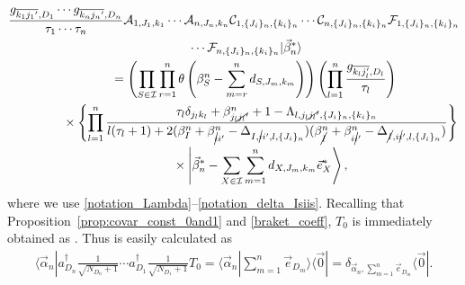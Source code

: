 \documentclass[10pt,a4paper]{amsart}
\numberwithin{equation}{section}
\begin{document}
\begin{gather}
 \frac{
 g_{\overline{k_{1}{j_{1}}'},D_{1}}
 \cdots
 g_{\overline{k_{n}{j_{n}}'},D_{n}}
 }{
 \tau_{1}
 \cdots
 \tau_{n}
 }
 \mathcal{A}_{
 1,
 J_{1},
 k_{1}
 }
 \cdots
 \mathcal{A}_{
 n,
 J_{n},
 k_{n}
 }
 \mathcal{C}_{
 1,
 \{
 J_{i}
 \}_{n}
 ,
 \{
 k_{i}
 \}_{n}
 }
 \cdots
 \mathcal{C}_{
 n,
 \{
 J_{i}
 \}_{n}
 ,
 \{
 k_{i}
 \}_{n}
 }
 \mathcal{F}_{
 1,
 \{
 J_{i}
 \}_{n}
 ,
 \{
 k_{i}
 \}_{n}
 }\nonumber\\
 \qquad
 \cdots
 \mathcal{F}_{
 n,
 \{
 J_{i}
 \}_{n}
 ,
 \{
 k_{i}
 \}_{n}
 }
 |
 \vec{\beta}_{n}^{\ast}
 \rangle
 \nonumber
 \\
 \qquad\phantom{\cdots}{}=
 \left(
 \prod_{
 S
 \in
 \mathcal{I}
 }
 \prod_{r=1}^{n}
 \theta
 \left(
 \beta_{S}^{n}
 -
 \sum_{m=r}^{n}
 d_{
 S,
 J_{m},
 k_{m}
 }
 \right)
 \right)
 \left(
 \prod_{l=1}^{n}
 \frac{g_{\overline{k_{l}j_{l}'},D_{l}}}{\tau_{l}}
 \right)\nonumber
 \\
 \qquad\phantom{\cdots=}{}
 \times
 \left\{
 \prod_{l=1}^{n}
 \frac{
 \tau_{l}
 \delta_{j_{l}k_{l}}
 +
 \beta_{j_{l}\cancel{j_{l}}'}^{n}
 +
 1
 -
 \Lambda_{
 l,
 j_{l}\cancel{j_{l}}',
 \{
 J_{i}
 \}_{n}
 ,
 \{
 k_{i}
 \}_{n}
 }
 }{
 l
 (
 \tau_{l}+1
 )
 +
 2
 (
 \beta_{I}^{n}
 +
 \beta_{\cancel{i}i'}^{n}
 -
 \Delta_{
 I,
 \cancel{i}i',
 l,
 \{
 J_{i}
 \}_{n}
 }
 )
 (
 \beta_{\cancel{I}}^{n}
 +
 \beta_{i\cancel{i}'}^{n}
 -
 \Delta_{
 \cancel{I},
 i\cancel{i}',
 l,
 \{
 J_{i}
 \}_{n}
 }
 )
 }
 \right\}\nonumber\\
 \qquad\phantom{\cdots=}{}\times
 \left|
 \vec{\beta}_{n}^{\ast}
 -
 \sum_{
 X
 \in
 \mathcal{I}
 }
 \sum_{m=1}^{n}
 d_{
 X,
 J_{m},
 k_{m}
 }
 \vec{e}_{X}^{\ast}
 \right\rangle
 ,
 \label{act_ACF}
\end{gather}
where we use \eqref{notation_Lambda}--\eqref{notation_delta_Isiis}.
Recalling that Proposition~\ref{prop:covar_const_0and1} and \eqref{braket_coeff}, $T_{0}$ is immediately obtained as
.
Thus
is easily calculated as
\begin{align}
\langle
 \vec{\alpha}_{n}
|
 a_{D_{n}}^{\dagger}
 \frac{1}{
 \sqrt{
 N_{D_{n}}
 +
 1
 }
 }
 \cdots
 a_{D_{1}}^{\dagger}
 \frac{1}{
 \sqrt{
 N_{D_{1}}
 +
 1
 }
 }
 T_{0}
 =
\Big\langle
 \vec{\alpha}_{n}
|
 \sum_{m=1}^{n}
 \vec{e}_{D_{m}}
 \Big\rangle
 \langle
 \vec{0}
 |
 =
 \delta_{
 \vec{\alpha}_{n},
 \sum_{m=1}^{n}
 \vec{e}_{D_{m}}
 }
 \langle
 \vec{0}
 | .
 \label{act_a_opr}
\end{align}
\end{document}
